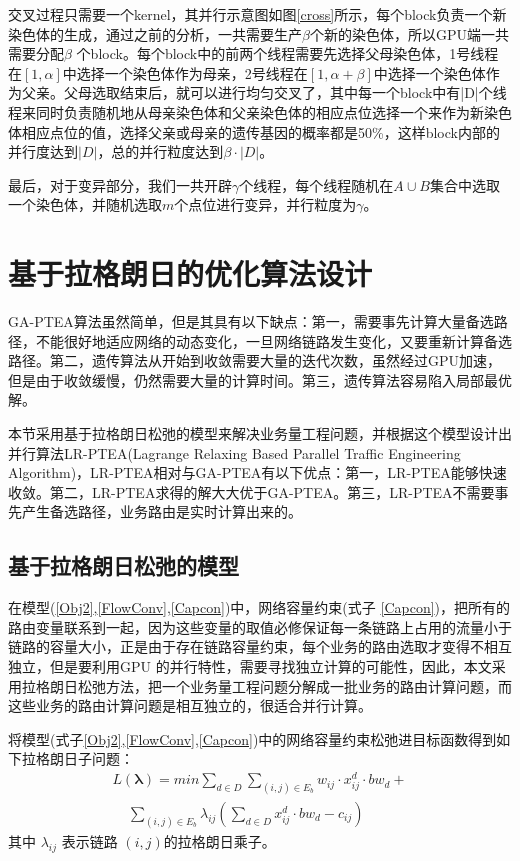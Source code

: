 交叉过程只需要一个kernel，其并行示意图如图\ref{cross}所示，每个block负责一个新染色体的生成，通过之前的分析，一共需要生产$\beta$个新的染色体，所以GPU端一共需要分配$\beta$ 个block。每个block中的前两个线程需要先选择父母染色体，1号线程在$[1,\alpha]$中选择一个染色体作为母亲，2号线程在$[1,\alpha+\beta]$中选择一个染色体作为父亲。父母选取结束后，就可以进行均匀交叉了，其中每一个block中有|D|个线程来同时负责随机地从母亲染色体和父亲染色体的相应点位选择一个来作为新染色体相应点位的值，选择父亲或母亲的遗传基因的概率都是50\%，这样block内部的并行度达到$|D|$，总的并行粒度达到$\beta \cdot |D|$。

最后，对于变异部分，我们一共开辟$\gamma$个线程，每个线程随机在$A\cup B$集合中选取一个染色体，并随机选取$m$个点位进行变异，并行粒度为$\gamma$。

\section{基于拉格朗日的优化算法设计}

GA-PTEA算法虽然简单，但是其具有以下缺点：第一，需要事先计算大量备选路径，不能很好地适应网络的动态变化，一旦网络链路发生变化，又要重新计算备选路径。第二，遗传算法从开始到收敛需要大量的迭代次数，虽然经过GPU加速，但是由于收敛缓慢，仍然需要大量的计算时间。第三，遗传算法容易陷入局部最优解。

本节采用基于拉格朗日松弛的模型来解决业务量工程问题，并根据这个模型设计出并行算法LR-PTEA(Lagrange Relaxing Based Parallel Traffic Engineering Algorithm)，LR-PTEA相对与GA-PTEA有以下优点：第一，LR-PTEA能够快速收敛。第二，LR-PTEA求得的解大大优于GA-PTEA。第三，LR-PTEA不需要事先产生备选路径，业务路由是实时计算出来的。
\subsection{基于拉格朗日松弛的模型}
在模型(\ref{Obj2},\ref{FlowConv},\ref{Capcon})中，网络容量约束(式子 \ref{Capcon})，把所有的路由变量联系到一起，因为这些变量的取值必修保证每一条链路上占用的流量小于链路的容量大小，正是由于存在链路容量约束，每个业务的路由选取才变得不相互独立，但是要利用GPU 的并行特性，需要寻找独立计算的可能性，因此，本文采用拉格朗日松弛方法，把一个业务量工程问题分解成一批业务的路由计算问题，而这些业务的路由计算问题是相互独立的，很适合并行计算。

将模型(式子\ref{Obj2},\ref{FlowConv},\ref{Capcon})中的网络容量约束松弛进目标函数得到如下拉格朗日子问题：
\begin{equation}\label{LagProb}
\begin{split}
L(\mathbf{\lambda})= min\sum\limits_{d \in D}\sum\limits_{(i,j) \in E_b} w_{ij}\cdot x_{ij}^d\cdot bw_d+ \\ ~~~~~\sum\limits_{(i,j) \in E_b}\lambda_{ij}(\sum\limits_{d \in D} x_{ij}^d \cdot bw_d-c_{ij})
\end{split}
\end{equation}
其中 $\lambda_{ij}$ 表示链路 $(i,j)$的拉格朗日乘子。

